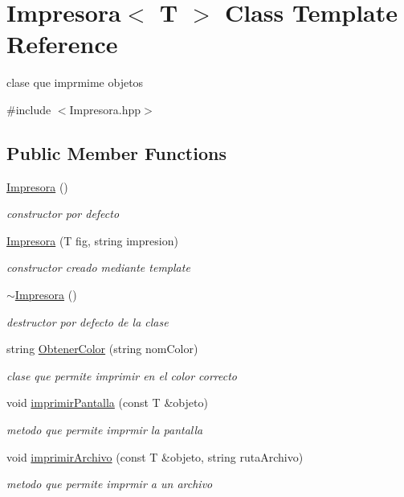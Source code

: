\hypertarget{class_impresora}{}\section{Impresora$<$ T $>$ Class Template Reference}
\label{class_impresora}


clase que imprmime objetos  




{\ttfamily \#include $<$Impresora.\+hpp$>$}

\subsection*{Public Member Functions}
\begin{DoxyCompactItemize}
\item 
\mbox{\label{class_impresora_a68f5ddc334afffb8715f6a6a06ee917b}} 
\hyperlink{class_impresora_a68f5ddc334afffb8715f6a6a06ee917b}{Impresora} ()
\begin{DoxyCompactList}\small\item\em constructor por defecto \end{DoxyCompactList}\item 
\hyperlink{class_impresora_a82093c181cb0601fc82dbbeff7247763}{Impresora} (T fig, string impresion)
\begin{DoxyCompactList}\small\item\em constructor creado mediante template \end{DoxyCompactList}\item 
\mbox{\label{class_impresora_a6e8f0ae96313109222fe715137f68b3e}} 
\hyperlink{class_impresora_a6e8f0ae96313109222fe715137f68b3e}{$\sim$\+Impresora} ()
\begin{DoxyCompactList}\small\item\em destructor por defecto de la clase \end{DoxyCompactList}\item 
string \hyperlink{class_impresora_abab8709ec339f549ef44dae439b33f12}{Obtener\+Color} (string nom\+Color)
\begin{DoxyCompactList}\small\item\em clase que permite imprimir en el color correcto \end{DoxyCompactList}\item 
void \hyperlink{class_impresora_a7427f11d194603c5ae2b7f4837c49f14}{imprimir\+Pantalla} (const T \&objeto)
\begin{DoxyCompactList}\small\item\em metodo que permite imprmir la pantalla \end{DoxyCompactList}\item 
void \hyperlink{class_impresora_ac63e5482787086f73c351732f4731239}{imprimir\+Archivo} (const T \&objeto, string ruta\+Archivo)
\begin{DoxyCompactList}\small\item\em metodo que permite imprmir a un archivo \end{DoxyCompactList}\end{DoxyCompactItemize}
